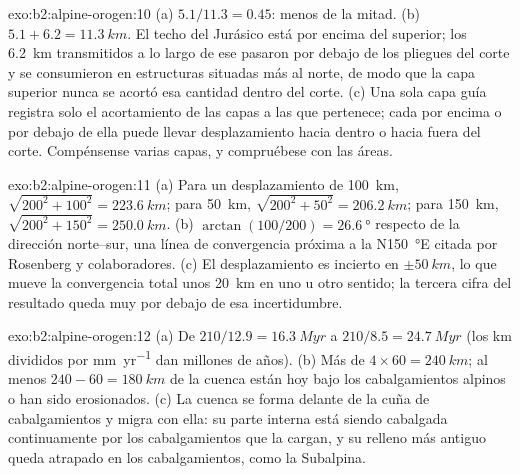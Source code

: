 \begin{solution}{exo:b2:alpine-orogen:10}
(a) $5.1/11.3 = 0.45$: menos de la mitad. (b) $5.1 + 6.2 = \qty{11.3}{km}$. El techo del
Jurásico está por encima del  superior; los \qty{6.2}{km} transmitidos a lo largo de ese 
pasaron por debajo de los pliegues del corte y se consumieron en estructuras situadas más al norte, de modo que la
capa superior nunca se acortó esa cantidad dentro del corte. (c) Una sola capa guía registra
solo el acortamiento de las capas a las que pertenece; cada  por encima o por debajo de ella puede
llevar desplazamiento hacia dentro o hacia fuera del corte. Compénsense varias capas, y compruébese con las áreas.
\end{solution}

\begin{solution}{exo:b2:alpine-orogen:11}
(a) Para un desplazamiento de \qty{100}{km}, $\sqrt{200^2 + 100^2} = \qty{223.6}{km}$; para
\qty{50}{km}, $\sqrt{200^2 + 50^2} = \qty{206.2}{km}$; para \qty{150}{km},
$\sqrt{200^2 + 150^2} = \qty{250.0}{km}$. (b) $\arctan(100/200) = \qty{26.6}{\degree}$ respecto de
la dirección norte--sur, una línea de convergencia próxima a la N\qty{150}{\degree}E citada por Rosenberg y
colaboradores. (c) El desplazamiento es incierto en $\pm\qty{50}{km}$, lo que mueve la convergencia
total unos \qty{20}{km} en uno u otro sentido; la tercera cifra del resultado queda muy por debajo de
esa incertidumbre.
\end{solution}

\begin{solution}{exo:b2:alpine-orogen:12}
(a) De $210/12.9 = \qty{16.3}{Myr}$ a $210/8.5 = \qty{24.7}{Myr}$ (los \unit{km} divididos por
\unit{mm.yr^{-1}} dan millones de años). (b) Más de $4\times60 = \qty{240}{km}$; al
menos $240 - 60 = \qty{180}{km}$ de la cuenca están hoy bajo los cabalgamientos alpinos o han sido
erosionados. (c) La cuenca se forma delante de la cuña de cabalgamientos y migra con ella: su parte
interna está siendo cabalgada continuamente por los cabalgamientos que la cargan, y su relleno más antiguo queda atrapado
en los cabalgamientos, como la  Subalpina.
\end{solution}

